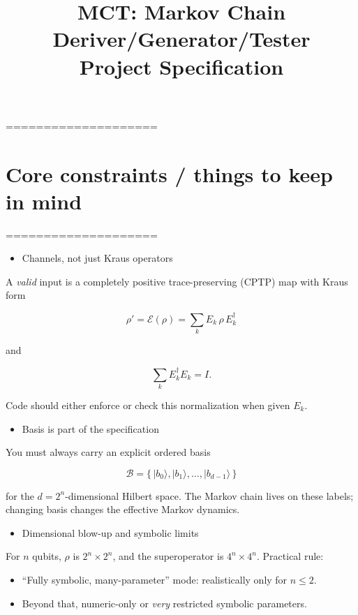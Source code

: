 \documentclass[11pt]{article}
\title{MCT: Markov Chain Deriver/Generator/Tester \\ Project Specification}
\author{}
\date{}
\begin{document}
\maketitle

====================
\section{Core constraints / things to keep in mind}
====================

\begin{itemize}
\item Channels, not just Kraus operators  
\end{itemize}
  A \textit{valid} input is a completely positive trace-preserving (CPTP) map with Kraus form  
  
\begin{equation}
\rho' = \mathcal{E}(\rho) = \sum_k E_k \,\rho\, E_k^\dagger
\end{equation}

  and
  
\begin{equation}
\sum_k E_k^\dagger E_k = I.
\end{equation}

  Code should either enforce or check this normalization when given $E_k$.

\begin{itemize}
\item Basis is part of the specification  
\end{itemize}
  You must always carry an explicit ordered basis  
  
\begin{equation}
\mathcal{B} = \{\,|b_0\rangle, |b_1\rangle, \dots, |b_{d-1}\rangle \,\}
\end{equation}

  for the $d = 2^n$-dimensional Hilbert space. The Markov chain lives on these labels; changing basis changes the effective Markov dynamics.

\begin{itemize}
\item Dimensional blow-up and symbolic limits  
\end{itemize}
  For $n$ qubits, $\rho$ is $2^n \times 2^n$, and the superoperator is $4^n \times 4^n$.  
  Practical rule:  
\begin{itemize}
\item ``Fully symbolic, many-parameter'' mode: realistically only for $n \le 2$.  
\item Beyond that, numeric-only or \textit{very} restricted symbolic parameters.
\end{itemize}
\end{document}
